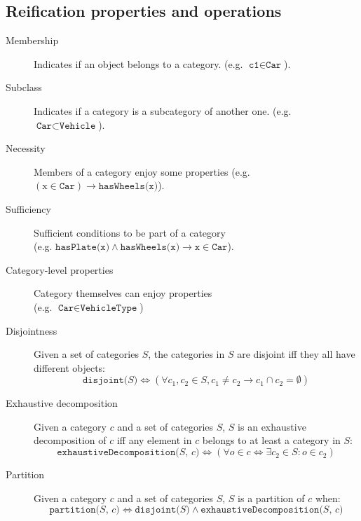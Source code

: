 \subsection{Reification properties and operations}
\begin{description}
    \item[Membership] 
        Indicates if an object belongs to a category.
        (e.g. $\texttt{c1} \in \texttt{Car}$).

    \item[Subclass] 
        Indicates if a category is a subcategory of another one.
        (e.g. $\texttt{Car} \subset \texttt{Vehicle}$).

    \item[Necessity] 
        Members of a category enjoy some properties 
        (e.g. $(\text{x} \in \texttt{Car}) \rightarrow \texttt{hasWheels(x)}$).

    \item[Sufficiency] 
        Sufficient conditions to be part of a category\\
        (e.g. $\texttt{hasPlate(x)} \land \texttt{hasWheels(x)} \rightarrow \texttt{x} \in \texttt{Car}$).

    \item[Category-level properties] 
        Category themselves can enjoy properties\\
        (e.g. $\texttt{Car} \in \texttt{VehicleType}$)

    \item[Disjointness] 
        Given a set of categories $S$, the categories in $S$ are disjoint iff they all have different objects:
        \[ \texttt{disjoint($S$)} \iff (\forall c_1, c_2 \in S, c_1 \neq c_2 \rightarrow c_1 \cap c_2 = \emptyset) \]

    \item[Exhaustive decomposition] 
        Given a category $c$ and a set of categories $S$, $S$ is an exhaustive decomposition of $c$ iff
        any element in $c$ belongs to at least a category in $S$:
        \[ \texttt{exhaustiveDecomposition($S$, $c$)} \iff (\forall o \in c \iff \exists c_2 \in S: o \in c_2) \]

    \item[Partition] 
        Given a category $c$ and a set of categories $S$, $S$ is a partition of $c$ when:
        \[ \texttt{partition($S$, $c$)} \iff \texttt{disjoint($S$)} \land \texttt{exhaustiveDecomposition($S$, $c$)} \]
\end{description}


